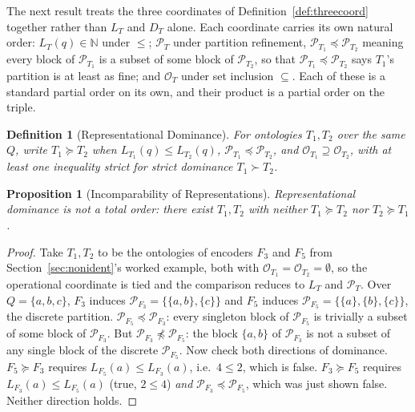 \documentclass[11pt]{article}
\theoremstyle{plain}
\newtheorem{definition}{Definition}
\newtheorem{proposition}{Proposition}
\begin{document}
The next result treats the three coordinates of Definition~\ref{def:threecoord} together rather than $L_T$ and $D_T$ alone. Each coordinate carries its own natural order: $L_T(q) \in \mathbb{N}$ under $\le$; $\mathcal{P}_T$ under partition refinement, $\mathcal{P}_{T_1} \preceq \mathcal{P}_{T_2}$ meaning every block of $\mathcal{P}_{T_1}$ is a subset of some block of $\mathcal{P}_{T_2}$, so that $\mathcal{P}_{T_1} \preceq \mathcal{P}_{T_2}$ says $T_1$'s partition is at least as fine; and $\mathcal{O}_T$ under set inclusion $\subseteq$. Each of these is a standard partial order on its own, and their product is a partial order on the triple.

\begin{definition}[Representational Dominance]
\label{def:dominance}
For ontologies $T_1, T_2$ over the same $Q$, write $T_1 \succeq T_2$ when $L_{T_1}(q) \le L_{T_2}(q)$, $\mathcal{P}_{T_1} \preceq \mathcal{P}_{T_2}$, and $\mathcal{O}_{T_1} \supseteq \mathcal{O}_{T_2}$, with at least one inequality strict for strict dominance $T_1 \succ T_2$.
\end{definition}

\begin{proposition}[Incomparability of Representations]
\label{prop:incomparability}
Representational dominance is not a total order: there exist $T_1, T_2$ with neither $T_1 \succeq T_2$ nor $T_2 \succeq T_1$.
\end{proposition}

\begin{proof}
Take $T_1, T_2$ to be the ontologies of encoders $F_3$ and $F_5$ from Section~\ref{sec:nonident}'s worked example, both with $\mathcal{O}_{T_1} = \mathcal{O}_{T_2} = \emptyset$, so the operational coordinate is tied and the comparison reduces to $L_T$ and $\mathcal{P}_T$. Over $Q = \{a,b,c\}$, $F_3$ induces $\mathcal{P}_{F_3} = \{\{a,b\},\{c\}\}$ and $F_5$ induces $\mathcal{P}_{F_5} = \{\{a\},\{b\},\{c\}\}$, the discrete partition. $\mathcal{P}_{F_5} \preceq \mathcal{P}_{F_3}$: every singleton block of $\mathcal{P}_{F_5}$ is trivially a subset of some block of $\mathcal{P}_{F_3}$. But $\mathcal{P}_{F_3} \not\preceq \mathcal{P}_{F_5}$: the block $\{a,b\}$ of $\mathcal{P}_{F_3}$ is not a subset of any single block of the discrete $\mathcal{P}_{F_5}$. Now check both directions of dominance. $F_5 \succeq F_3$ requires $L_{F_5}(a) \le L_{F_3}(a)$, i.e.\ $4 \le 2$, which is false. $F_3 \succeq F_5$ requires $L_{F_3}(a) \le L_{F_5}(a)$ (true, $2 \le 4$) \emph{and} $\mathcal{P}_{F_3} \preceq \mathcal{P}_{F_5}$, which was just shown false. Neither direction holds.
\end{proof}
\end{document}
